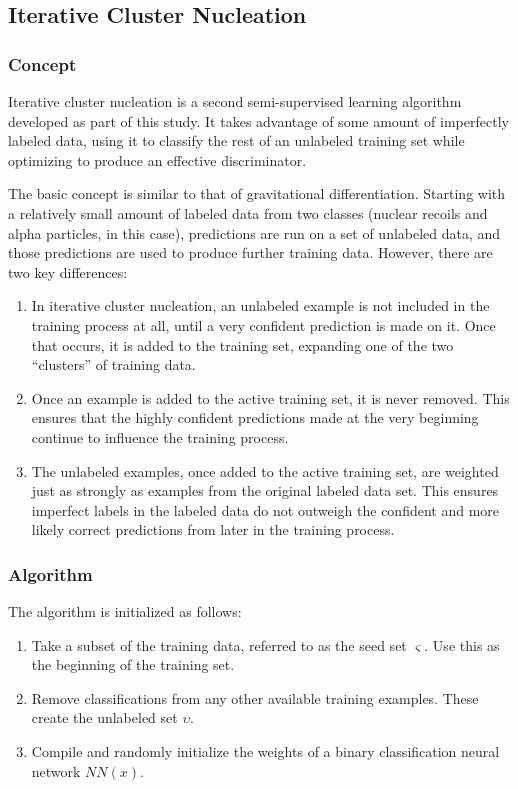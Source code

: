 \documentclass[10pt]{article}
\begin{document}
\subsection{Iterative Cluster Nucleation}

\subsubsection{Concept}

Iterative cluster nucleation is a second semi-supervised learning algorithm developed as part of this study. It takes advantage of some amount of imperfectly labeled data, using it to classify the rest of an unlabeled training set while optimizing to produce an effective discriminator.

The basic concept is similar to that of gravitational differentiation. Starting with a relatively small amount of labeled data from two classes (nuclear recoils and alpha particles, in this case), predictions are run on a set of unlabeled data, and those predictions are used to produce further training data. However, there are two key differences:

\begin{enumerate}
    \item In iterative cluster nucleation, an unlabeled example is not included in the training process at all, until a very confident prediction is made on it. Once that occurs, it is added to the training set, expanding one of the two ``clusters'' of training data.
    \item Once an example is added to the active training set, it is never removed. This ensures that the highly confident predictions made at the very beginning continue to influence the training process.
    \item The unlabeled examples, once added to the active training set, are weighted just as strongly as examples from the original labeled data set. This ensures imperfect labels in the labeled data do not outweigh the confident and more likely correct predictions from later in the training process.
\end{enumerate}

\subsubsection{Algorithm}

The algorithm is initialized as follows:

\begin{enumerate}
    \item Take a subset of the training data, referred to as the seed set $\varsigma$. Use this as the beginning of the training set.
    \item Remove classifications from any other available training examples. These create the unlabeled set $\upsilon$.
    \item Compile and randomly initialize the weights of a binary classification neural network $NN(x)$.
\end{enumerate}
\end{document}
